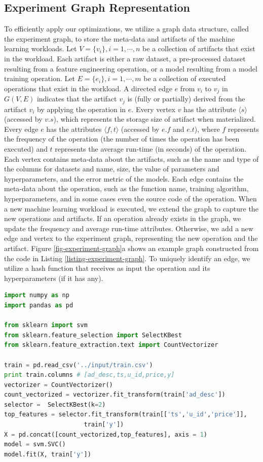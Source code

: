 \subsection{Experiment Graph Representation}\label{sub-graph-construction}
To efficiently apply our optimizations, we utilize a graph data structure, called the experiment graph, to store the meta-data and artifacts of the machine learning workloads.
Let $V=\{v_i\}, i = 1, \cdots, n$ be a collection of artifacts that exist in the workload.
Each artifact is either a raw dataset, a pre-processed dataset resulting from a feature engineering operation, or a model resulting from a model training operation.
Let $E=\{e_i\}, i = 1, \cdots, m$ be a collection of executed operations that exist in the workload.
A directed edge $e$ from $v_i$ to $v_j$ in $G(V,E)$ indicates that the artifact $v_j$ is (fully or partially) derived from the artifact $v_i$ by applying the operation in $e$.
Every vertex $v$ has the attribute $\langle s \rangle$ (accessed by $v.s$), which represents the storage size of artifact when materialized.
Every edge $e$ has the attributes $\langle f, t\rangle$ (accessed by $e.f$ and $e.t$), where $f$ represents the frequency of the operation (the number of times the operation has been executed) and $t$ represents the average run-time (in seconds) of the operation.
Each vertex contains meta-data about the artifacts, such as the name and type of the columns for datasets and name, size, the value of parameters and hyperparameters, and the error metric of the models.
Each edge contains the meta-data about the operation, such as the function name, training algorithm, hyperparameters, and in some cases even the source code of the operation.
When a new machine learning workload is executed, we extend the graph to capture the new operations and artifacts.
If an operation already exists in the graph, we update the frequency and average run-time attributes.
Otherwise, we add a new edge and vertex to the experiment graph, representing the new operation and the artifact.
Figure \ref{fig-experiment-graph}a shows an example graph constructed from the code in Listing \ref{listing-experiment-graph}.
To uniquely identify an edge, we utilize a hash function that receives as input the operation and its hyperparameters (if it has any).

\begin{lstlisting}[language=Python, caption=Example script,captionpos=b,label = {listing-experiment-graph}]
import numpy as np
import pandas as pd

from sklearn import svm
from sklearn.feature_selection import SelectKBest
from sklearn.feature_extraction.text import CountVectorizer

train = pd.read_csv('../input/train.csv') 
print train.columns # [ad_desc,ts,u_id,price,y]
vectorizer = CountVectorizer()
count_vectorized = vectorizer.fit_transform(train['ad_desc'])
selector =  SelectKBest(k=2)
top_features = selector.fit_transform(train[['ts','u_id','price']], 
				      train['y'])
X = pd.concat([count_vectorized,top_features], axis = 1)
model = svm.SVC()
model.fit(X, train['y'])
\end{lstlisting}

